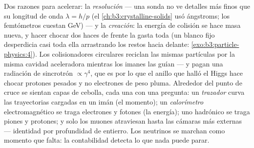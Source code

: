 \begin{remark}\label{rem:b3:particle-physics:machines}
Dos razones para acelerar: la \emph{resolución} --- una sonda no ve
detalles más finos que su longitud de onda $\lambda = h/p$
(el \cref{ch:b3:crystalline-solids} usó ángstroms; los femtómetros
cuestan \unit{GeV}) --- y la \emph{creación}: la energía de colisión
se hace masa nueva, y hacer chocar dos haces de frente la gasta toda
(un blanco fijo desperdicia casi toda ella arrastrando los restos hacia delante:
\cref{exo:b3:particle-physics:4}). Los colisionadores circulares reciclan
las mismas partículas por la misma cavidad aceleradora mientras
los imanes las guían --- y pagan una radiación de sincrotrón
$\propto\gamma^4$, que es por lo que el anillo que halló el Higgs
hace chocar protones pesados y no electrones de peso pluma. Alrededor del
punto de cruce se sientan capas de cebolla, cada una con una pregunta: un
\emph{trazador} curva las trayectorias cargadas en un imán (el momento); un
\emph{calorímetro} electromagnético se traga electrones y
fotones (la energía); uno hadrónico se traga piones y protones;
y solo los muones atraviesan hasta las cámaras más externas ---
identidad por profundidad de entierro. Los neutrinos se marchan como momento
que falta: la contabilidad detecta lo que nada puede parar.
\end{remark}

